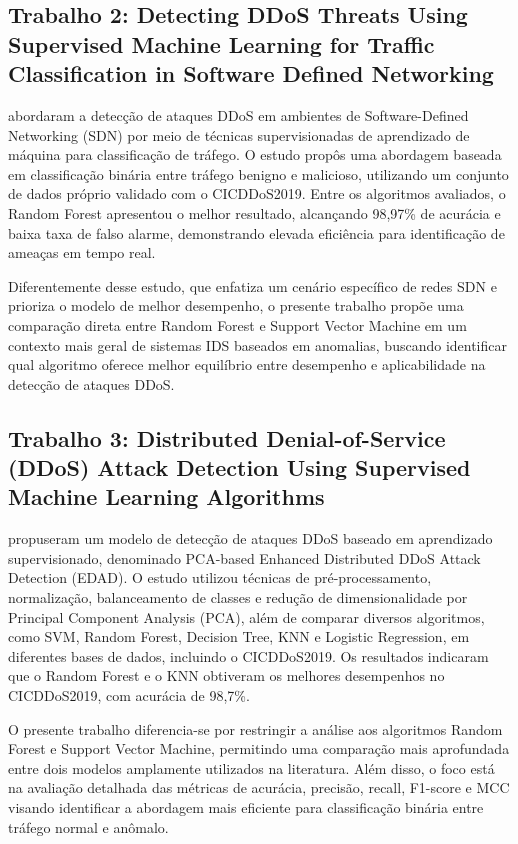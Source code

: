 \documentclass[
    12pt,                %
    openright,           %
    oneside,             %
    a4paper,             %
    english,             %
    brazil               %
]{abntex2}
\begin{document}
\subsection{Trabalho 2: Detecting DDoS Threats Using Supervised Machine Learning for Traffic Classification in Software Defined Networking}

 abordaram a detecção de ataques DDoS em ambientes de Software-Defined Networking (SDN) por meio de técnicas supervisionadas de aprendizado de máquina para classificação de tráfego. O estudo propôs uma abordagem baseada em classificação binária entre tráfego benigno e malicioso, utilizando um conjunto de dados próprio validado com o CICDDoS2019. Entre os algoritmos avaliados, o Random Forest apresentou o melhor resultado, alcançando 98,97\% de acurácia e baixa taxa de falso alarme, demonstrando elevada eficiência para identificação de ameaças em tempo real.

Diferentemente desse estudo, que enfatiza um cenário específico de redes SDN e prioriza o modelo de melhor desempenho, o presente trabalho propõe uma comparação direta entre Random Forest e Support Vector Machine em um contexto mais geral de sistemas IDS baseados em anomalias, buscando identificar qual algoritmo oferece melhor equilíbrio entre desempenho e aplicabilidade na detecção de ataques DDoS.


\subsection{Trabalho 3: Distributed Denial-of-Service (DDoS) Attack Detection Using Supervised Machine Learning Algorithms}

 propuseram um modelo de detecção de ataques DDoS baseado em aprendizado supervisionado, denominado PCA-based Enhanced Distributed DDoS Attack Detection (EDAD). O estudo utilizou técnicas de pré-processamento, normalização, balanceamento de classes e redução de dimensionalidade por Principal Component Analysis (PCA), além de comparar diversos algoritmos, como SVM, Random Forest, Decision Tree, KNN e Logistic Regression, em diferentes bases de dados, incluindo o CICDDoS2019. Os resultados indicaram que o Random Forest e o KNN obtiveram os melhores desempenhos no CICDDoS2019, com acurácia de 98,7\%.

O presente trabalho diferencia-se por restringir a análise aos algoritmos Random Forest e Support Vector Machine, permitindo uma comparação mais aprofundada entre dois modelos amplamente utilizados na literatura. Além disso, o foco está na avaliação detalhada das métricas de acurácia, precisão, recall, F1-score e MCC visando identificar a abordagem mais eficiente para classificação binária entre tráfego normal e anômalo.
\end{document}
